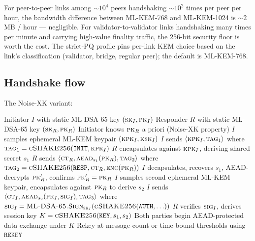 For peer-to-peer links among $\sim 10^4$ peers handshaking $\sim 10^2$ times
per peer per hour, the bandwidth difference between ML-KEM-768 and
ML-KEM-1024 is $\sim 2$ MB / hour --- negligible. For validator-to-validator
links handshaking many times per minute and carrying high-value finality
traffic, the 256-bit security floor is worth the cost. The strict-PQ
profile pins per-link KEM choice based on the link's classification
(validator, bridge, regular peer); the default is ML-KEM-768.

\subsection{Handshake flow}

The Noise-XK variant:

\begin{algorithm}
\caption{Strict-PQ peer handshake (Noise-XK over ML-KEM + ML-DSA-65)}
\label{alg:p2p-handshake}
\begin{algorithmic}[1]
\Require Initiator $I$ with static ML-DSA-65 key $(\textsc{sk}_I, \textsc{pk}_I)$
\Require Responder $R$ with static ML-DSA-65 key $(\textsc{sk}_R, \textsc{pk}_R)$
\Require Initiator knows $\textsc{pk}_R$ a priori (Noise-XK property)
\State $I$ samples ephemeral ML-KEM keypair $(\textsc{kpk}_I, \textsc{ksk}_I)$
\State $I$ sends $\langle \textsc{kpk}_I, \textsc{tag}_1 \rangle$ where $\textsc{tag}_1 = \textsc{cSHAKE256}(\texttt{INIT}, \textsc{kpk}_I)$
\State $R$ encapsulates against $\textsc{kpk}_I$, deriving shared secret $s_1$
\State $R$ sends $\langle \textsc{ct}_R, \textsc{aead}_{s_1}(\textsc{pk}_R), \textsc{tag}_2 \rangle$
  where $\textsc{tag}_2 = \textsc{cSHAKE256}(\texttt{RESP}, \textsc{ct}_R, \textsc{enc}(\textsc{pk}_R))$
\State $I$ decapsulates, recovers $s_1$, AEAD-decrypts $\textsc{pk}_R'$, confirms $\textsc{pk}_R' = \textsc{pk}_R$
\State $I$ samples second ephemeral ML-KEM keypair, encapsulates against $\textsc{pk}_R$
  to derive $s_2$
\State $I$ sends $\langle \textsc{ct}_I, \textsc{aead}_{s_2}(\textsc{pk}_I, \textsc{sig}_I), \textsc{tag}_3 \rangle$
  where $\textsc{sig}_I = \textsc{ML-DSA-65.Sign}_{\textsc{sk}_I}(\textsc{cSHAKE256}(\texttt{AUTH}, \ldots))$
\State $R$ verifies $\textsc{sig}_I$, derives session key $K = \textsc{cSHAKE256}(\texttt{KEY}, s_1, s_2)$
\State Both parties begin AEAD-protected data exchange under $K$
\State Rekey at message-count or time-bound thresholds using $\texttt{REKEY}$
\end{algorithmic}
\end{algorithm}

